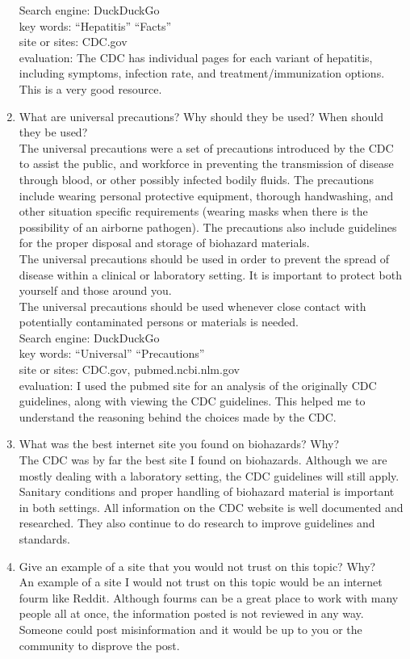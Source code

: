 \documentclass[letterpaper, 11pt]{article}
\begin{document}
\begin{enumerate}
Search engine: DuckDuckGo\\
key words: ``Hepatitis'' ``Facts''\\
site or sites: CDC.gov\\
evaluation: The CDC has individual pages for each variant of hepatitis, including symptoms, infection rate, and treatment/immunization options. This is a very good resource.\\

\item What are universal precautions? Why should they be used? When should they be used?\\
The universal precautions were a set of precautions introduced by the CDC to assist the public, and workforce in preventing the transmission of disease through blood, or other possibly infected bodily fluids. The precautions include wearing personal protective equipment, thorough handwashing, and other situation specific requirements (wearing masks when there is the possibility of an airborne pathogen). The precautions also include guidelines for the proper disposal and storage of biohazard materials.\\
The universal precautions should be used in order to prevent the spread of disease within a clinical or laboratory setting. It is important to protect both yourself and those around you.\\
The universal precautions should be used whenever close contact with potentially contaminated persons or materials is needed.\\

Search engine: DuckDuckGo\\
key words: ``Universal'' ``Precautions''\\
site or sites: CDC.gov, pubmed.ncbi.nlm.gov\\
evaluation: I used the pubmed site for an analysis of the originally CDC guidelines, along with viewing the CDC guidelines. This helped me to understand the reasoning behind the choices made by the CDC.\\

\item What was the best internet site you found on biohazards? Why?\\
The CDC was by far the best site I found on biohazards. Although we are mostly dealing with a laboratory setting, the CDC guidelines will still apply. Sanitary conditions and proper handling of biohazard material is important in both settings. All information on the CDC website is well documented and researched. They also continue to do research to improve guidelines and standards.\\

\item Give an example of a site that you would not trust on this topic? Why?\\
An example of a site I would not trust on this topic would be an internet fourm like Reddit. Although fourms can be a great place to work with many people all at once, the information posted is not reviewed in any way. Someone could post misinformation and it would be up to you or the community to disprove the post.
\end{enumerate}
\end{document}
